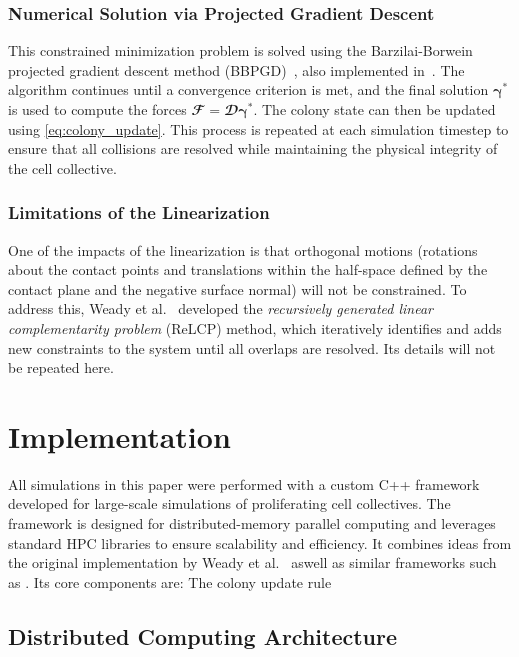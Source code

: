 \documentclass[conference]{IEEEtran}
\begin{document}
\subsubsection{Numerical Solution via Projected Gradient Descent}

This constrained minimization problem is solved using the Barzilai-Borwein projected gradient descent method (BBPGD)~\cite{BBPGD}, also implemented in~\cite{Weady2024,Yan2019}. The algorithm continues until a convergence criterion is met, and the final solution $\boldsymbol{\gamma}^*$ is used to compute the forces $\mathbfcal{F} = \mathbfcal{D}\boldsymbol{\gamma}^*$. The colony state can then be updated using \autoref{eq:colony_update}. This process is repeated at each simulation timestep to ensure that all collisions are resolved while maintaining the physical integrity of the cell collective.

\subsubsection{Limitations of the Linearization}

One of the impacts of the linearization is that orthogonal motions (rotations about the contact points and translations within the half-space defined by the contact plane and the negative surface normal) will not be constrained. To address this, Weady et al.~\cite{Weady2024} developed the \textit{recursively generated linear complementarity problem} (ReLCP) method, which iteratively identifies and adds new constraints to the system until all overlaps are resolved. Its details will not be repeated here.


\newpage

\section{Implementation}

All simulations in this paper were performed with a custom C++ framework developed for large-scale simulations of proliferating cell collectives. The framework is designed for distributed-memory parallel computing and leverages standard HPC libraries to ensure scalability and efficiency. It combines ideas from the original implementation by Weady et al.~\cite{Weady2024} aswell as similar frameworks such as \cite{Tasora2008,Yan2019}. Its core components are:
The colony update rule
\subsection{Distributed Computing Architecture}
\end{document}
